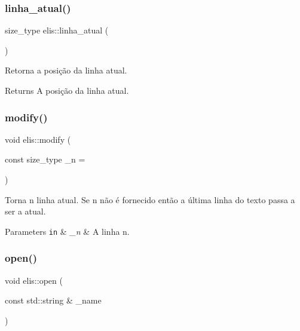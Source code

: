 \subsubsection{\texorpdfstring{linha\+\_\+atual()}{linha\_atual()}}
{\footnotesize\ttfamily size\+\_\+type elis\+::linha\+\_\+atual (\begin{DoxyParamCaption}{ }\end{DoxyParamCaption})\hspace{0.3cm}{\ttfamily [inline]}}



Retorna a posição da linha atual. 

\begin{DoxyReturn}{Returns}
A posição da linha atual. 
\end{DoxyReturn}
\mbox{\label{classelis_a863421e1b739bbaa727da3ec66333248}} 
\subsubsection{\texorpdfstring{modify()}{modify()}}
{\footnotesize\ttfamily void elis\+::modify (\begin{DoxyParamCaption}\item[{const size\+\_\+type}]{\+\_\+n = {} }\end{DoxyParamCaption})}



Torna n linha atual. Se n não é fornecido então a última linha do texto passa a ser a atual. 


\begin{DoxyParams}[1]{Parameters}
\mbox{\tt in}  & {\em \+\_\+n} & A linha n. \\
\hline
\end{DoxyParams}
\mbox{\label{classelis_a23ea13aa06bd599d37b2b8f7fd8a5bf9}} 
\subsubsection{\texorpdfstring{open()}{open()}}
{\footnotesize\ttfamily void elis\+::open (\begin{DoxyParamCaption}\item[{const std\+::string \&}]{\+\_\+name }\end{DoxyParamCaption})}



